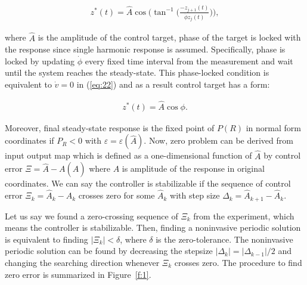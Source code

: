 \documentclass[openacc]{rsproca_new}%
\def\epsilon{\varepsilon}
\newcommand{\Eref}[1]{(\ref{#1})}
\newcommand{\Fref}[1]{Figure~\ref{#1}}
\begin{document}
\begin{align}\label{eq:26}
z^*(t)=\hat A\cos\Big(\tan^{-1}\Big({\frac{-z_{j+1}(t)}{ \dot \phi z_{j}(t)}}\Big) \Big),
\end{align}

\noindent where $\hat A$ is the amplitude of the control target, phase of the target is locked with the response since single harmonic response is assumed. Specifically, phase is locked by updating $\dot\phi$ every fixed time interval from the measurement and wait until the system reaches the steady-state. This phase-locked condition is equivalent to $\dot v=0$ in \Eref{eq:22} and as a result control target has a form:

\begin{align}\label{eq:tg}
 z^*(t)=\hat A\cos{\phi}.
\end{align}

\noindent Moreover, final steady-state response is the fixed point of $P(R)$ in normal form coordinates if $P_R<0$ with $\epsilon=\epsilon(\hat A)$. Now, zero problem can be derived from input output map which is defined as a one-dimensional function of $\hat A$ by control error $\Xi=\hat A - A(\hat A)$ where $A$ is amplitude of the response in original coordinates. We can say the controller is stabilizable if the sequence of control error $\Xi_k=\hat A_k-A_k$ crosses zero for some $\hat A_k$ with step size $\Delta_k=\hat A_{k+1}-\hat A_{k}$.

Let us say we found a zero-crossing sequence of $\Xi_k$ from the experiment, which means the controller is stabilizable. Then, finding a noninvasive periodic solution is equivalent to finding  $|\Xi_k|<\delta$, where $\delta$ is the zero-tolerance. The noninvasive periodic solution can be found by decreasing the stepsize $|\Delta_k|=|\Delta_{k-1}|/2$ and changing the searching direction whenever $\Xi_k$ crosses zero. The procedure to find zero error is summarized in \Fref{f:1}.
\end{document}
